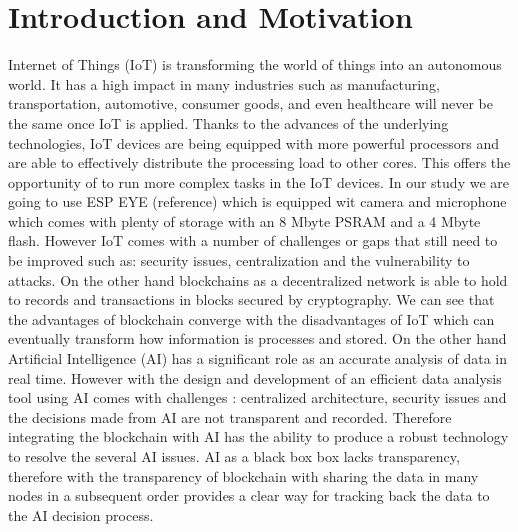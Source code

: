 \chapter{Introduction and Motivation}
\label{thesis:introduction}



Internet of Things (IoT) is transforming the world of things into an autonomous world. It has a high impact in many industries such as manufacturing, transportation, automotive, consumer goods, and even healthcare will never be the same
once IoT is applied. Thanks to the advances of the underlying technologies, IoT devices are being equipped with more powerful processors and are able to effectively distribute the processing load to other cores. This offers the opportunity of to run more complex tasks in the IoT devices. In our study we are going to use ESP EYE (reference) which is equipped wit camera and microphone which comes with plenty of storage with an 8 Mbyte PSRAM and a 4 Mbyte flash. 
However IoT comes with a number of challenges or gaps  that still need to be improved such as: security issues, centralization and the vulnerability to attacks. 
On the other hand blockchains as a decentralized network is able to hold to records and transactions in blocks secured by cryptography. We can see that the advantages of blockchain converge with the disadvantages of IoT which can eventually transform how information is processes and stored. On the other hand Artificial Intelligence (AI) has a significant role as an accurate analysis of data in real time. However with the design and development of an efficient data analysis tool  using AI comes with challenges : centralized architecture, security issues and the decisions made from AI are not transparent and recorded. Therefore integrating the blockchain with AI has the ability to produce a robust technology to resolve the several AI issues. AI as a black box box lacks transparency, therefore with the transparency of blockchain with sharing the data in many nodes in a subsequent order provides a clear way for tracking back the data to the AI decision process.   

